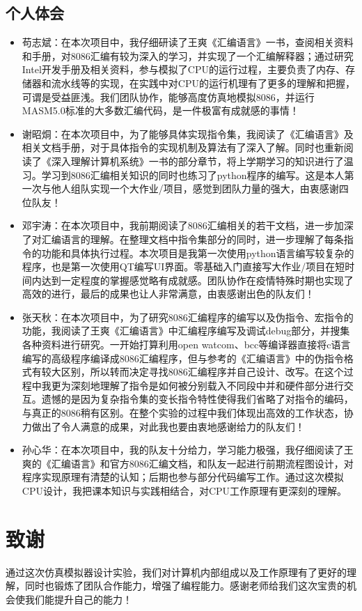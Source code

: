 \documentclass[UTF8,12pt]{article}
\begin{document}
	\subsection{个人体会}
	\begin{itemize}
	    \item 苟志斌：在本次项目中，我仔细研读了王爽《汇编语言》一书，查阅相关资料和手册，对8086汇编有较为深入的学习，并实现了一个汇编解释器；通过研究Intel开发手册及相关资料，参与模拟了CPU的运行过程，主要负责了内存、存储器和流水线等的实现，在实践中对CPU的运行机理有了更多的理解和把握，可谓是受益匪浅。我们团队协作，能够高度仿真地模拟8086，并运行MASM5.0标准的大多数汇编代码，是一件极富有成就感的事情！
	    \item 谢昭烔：在本次项目中，为了能够具体实现指令集，我阅读了《汇编语言》及相关文档手册，对于具体指令的实现机制及算法有了深入了解。同时也重新阅读了《深入理解计算机系统》一书的部分章节，将上学期学习的知识进行了温习。学习到8086汇编相关知识的同时也练习了python程序的编写。这是本人第一次与他人组队实现一个大作业/项目，感觉到团队力量的强大，由衷感谢四位队友！
	    \item 邓宇涛：在本次项目中，我前期阅读了8086汇编相关的若干文档，进一步加深了对汇编语言的理解。在整理文档中指令集部分的同时，进一步理解了每条指令的功能和具体执行过程。本次项目是我第一次使用python语言编写较复杂的程序，也是第一次使用QT编写UI界面。零基础入门直接写大作业/项目在短时间内达到一定程度的掌握感觉略有成就感。团队协作在疫情特殊时期也实现了高效的进行，最后的成果也让人非常满意，由衷感谢出色的队友们！
	    \item 张天秋：在本次项目中，为了研究8086汇编程序的编写以及伪指令、宏指令的功能，我阅读了王爽《汇编语言》中汇编程序编写及调试debug部分，并搜集各种资料进行研究。一开始打算利用open watcom、bcc等编译器直接将c语言编写的高级程序编译成8086汇编程序，但与参考的《汇编语言》中的伪指令格式有较大区别，所以转而决定寻找8086汇编程序并自己设计、改写。在这个过程中我更为深刻地理解了指令是如何被分别载入不同段中并和硬件部分进行交互。遗憾的是因为复杂指令集的变长指令特性使得我们省略了对指令的编码，与真正的8086稍有区别。在整个实验的过程中我们体现出高效的工作状态，协力做出了令人满意的成果，对此我也要由衷地感谢给力的队友们！
	    \item 孙心华：在本次项目中，我的队友十分给力，学习能力极强，我仔细阅读了王爽的《汇编语言》和官方8086汇编文档，和队友一起进行前期流程图设计，对程序实现原理有清楚的认知；后期也参与部分代码编写工作。通过这次模拟CPU设计，我把课本知识与实践相结合，对CPU工作原理有更深刻的理解。
	\end{itemize}
	
	
	
	
	
	\section{致谢}		
	通过这次仿真模拟器设计实验，我们对计算机内部组成以及工作原理有了更好的理解，同时也锻炼了团队合作能力，增强了编程能力。感谢老师给我们这次宝贵的机会使我们能提升自己的能力！
	
\end{document}
